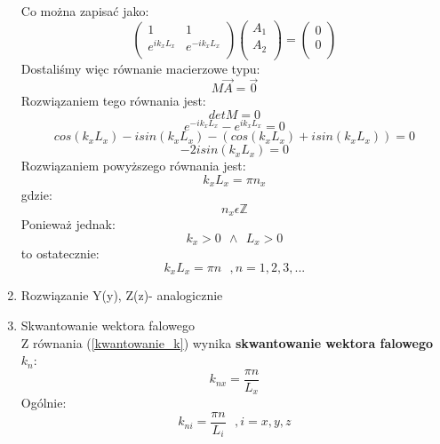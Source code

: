 \begin{enumerate}
\begin{equation}
\end{equation}
Co można zapisać jako:
\begin{displaymath}
	 \left( \begin{array}{cc}
		1 & 1  \\
		 e^{ik_xL_x} & e^{-ik_xL_x} \\
	\end{array} \right)
	 \left( \begin{array}{c}
		A_1  \\
		A_2 \\
	\end{array} \right) 
	=
	\left( \begin{array}{c}
		0 \\
		0 \\
	\end{array} \right) 
\end{displaymath}
Dostaliśmy więc równanie macierzowe typu:
\begin{equation} M\vec{A}=\vec{0} \end{equation}
Rozwiązaniem tego równania jest:
\begin{equation} det M=0 \end{equation}
\begin{equation} e^{-ik_xL_x} - e^{ik_xL_x} =0 \end{equation}
\begin{equation} cos(k_xL_x)-isin(k_xL_x)-( cos(k_xL_x)+isin(k_xL_x))=0 \end{equation}
\begin{equation} -2isin(k_xL_x)=0 \end{equation}
Rozwiązaniem powyższego równania jest:
\begin{equation} k_xL_x=\pi n_x \end{equation}
gdzie:
\begin{equation}n_x \epsilon \mathbb{Z}\end{equation}
Ponieważ jednak:
\begin{equation} k_x>0~~\wedge~~L_x>0\end{equation}
to ostatecznie:
\begin{equation}k_xL_x=\pi n~~~,n=1,2,3,...\label{kwantowanie_k}\end{equation}

\item Rozwiązanie Y(y), Z(z)- analogicznie
\item Skwantowanie wektora falowego\\
Z równania (\ref{kwantowanie_k}) wynika \textbf{skwantowanie wektora falowego $k_n$}:
\begin{equation} k_{nx}=\frac{\pi n}{L_x}\end{equation}
Ogólnie:
\begin{equation} k_{ni}=\frac{\pi n}{L_i}~~~,i=x,y,z \label{k_wzor}\end{equation}


\end{enumerate}
